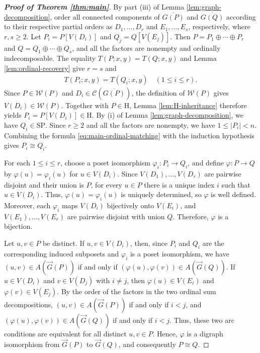 \documentclass[11pt,a4paper]{article}
\begin{document}
\begin{proof}[\rm\textbf{Proof of Theorem \ref{thm:main}}]
By part \textup{(iii)} of Lemma \ref{lem:graph-decomposition},
order all connected components of $\overline{G(P)}$ and
$\overline{G(Q)}$ according to their respective partial orders as
$D_1,\ldots,D_r$ and $E_1,\ldots,E_s$, respectively, where $r,s\geq2$.
Let $P_i=P[V(D_i)]$ and $Q_j=Q[V(E_j)]$.
Then $P=P_1\oplus\cdots\oplus P_r$ and
$Q=Q_1\oplus\cdots\oplus Q_s$,
and all the factors are nonempty and ordinally indecomposable.
The equality $T(P;x,y)=T(Q;x,y)$ and  Lemma \ref{lem:ordinal-recovery} give $r=s$ and
\begin{eqnarray}\label{eq:main-ordinal-matching}
T(P_i;x,y)=T(Q_i;x,y)\quad(1\leq i\leq r).
\end{eqnarray}
Since $P\in\mathcal W(P)$ and $D_i\in\mathcal C(\overline{G(P)})$,
the definition of $\mathcal W(P)$ gives $V(D_i)\in\mathcal W(P)$.
Together with $P\in\mathrm H$, Lemma \ref{lem:H-inheritance} therefore yields $P_i=P[V(D_i)]\in\mathrm H$.
By \textup{(i)} of Lemma \ref{lem:graph-decomposition}, we have $Q_i\in\mathrm{SP}$.
Since $r\geq2$ and all the factors are nonempty, we have $1\leq|P_i|<n$.
Combining the formula \eqref{eq:main-ordinal-matching} with the induction hypothesis gives $P_i\cong Q_i$.

For each $1\leq i\leq r$, choose a poset isomorphism
$\varphi_i:P_i\to Q_i$, and define $\varphi:P\to Q$ by
$\varphi(u)=\varphi_i(u)$ for $u\in V(D_i)$.
Since $V(D_1),\ldots,V(D_r)$ are pairwise disjoint
and their union is $P$, for every $u\in P$
there is a unique index $i$ such that $u\in V(D_i)$.
Thus, $\varphi(u)=\varphi_i(u)$ is uniquely determined,
so $\varphi$ is well defined.
Moreover, each $\varphi_i$ maps $V(D_i)$ bijectively onto $V(E_i)$,
and $V(E_1),\ldots,V(E_r)$ are pairwise disjoint with union $Q$.
Therefore, $\varphi$ is a bijection.

Let $u,v\in P$ be distinct. If $u,v\in V(D_i)$, then, since $P_i$ and $Q_i$
are the corresponding induced subposets and $\varphi_i$
is a poset isomorphism, we have $(u,v)\in A(\vec G(P))$ if and only if
$(\varphi(u),\varphi(v))\in A(\vec G(Q))$.
If $u\in V(D_i)$ and $v\in V(D_j)$ with $i\neq j$,
then $\varphi(u)\in V(E_i)$ and $\varphi(v)\in V(E_j)$.
By the order of the factors in the two ordinal sum decompositions,
$(u,v)\in A(\vec G(P))$ if and only if $i<j$,
and $(\varphi(u),\varphi(v))\in A(\vec G(Q))$ if and only if $i<j$.
Thus, these two arc conditions are equivalent for all distinct $u,v\in P$.
Hence, $\varphi$ is a digraph isomorphism from $\vec G(P)$ to $\vec G(Q)$,
and consequently $P\cong Q$.


\end{proof}
\end{document}
